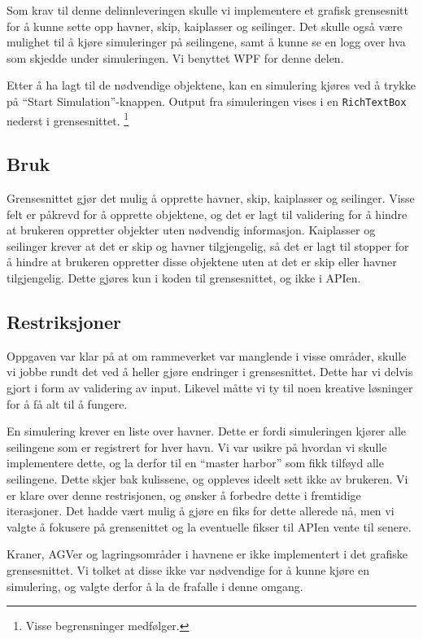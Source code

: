 \documentclass[12pt]{article}
\begin{document}
Som krav til denne delinnleveringen skulle vi implementere et grafisk grensesnitt for 
å kunne sette opp havner, skip, kaiplasser og seilinger. Det skulle også være mulighet til
å kjøre simuleringer på seilingene, samt å kunne se en logg over hva som skjedde under simuleringen.
Vi benyttet WPF for denne delen.

Etter å ha lagt til de nødvendige objektene, kan en simulering kjøres ved å trykke på ``Start Simulation''-knappen.
Output fra simuleringen vises i en \texttt{RichTextBox} nederst i grensesnittet. \footnote{Visse begrensninger medfølger.}

\subsection{Bruk}
Grensesnittet gjør det mulig å opprette havner, skip, kaiplasser og seilinger. Visse felt er påkrevd for å opprette objektene, 
og det er lagt til validering for å hindre at brukeren oppretter objekter uten nødvendig informasjon. 
Kaiplasser og seilinger krever at det er skip og havner tilgjengelig, så det er lagt til stopper for å hindre at brukeren oppretter
disse objektene uten at det er skip eller havner tilgjengelig. Dette gjøres kun i koden til grensesnittet, og ikke i APIen.

\subsection{Restriksjoner}
Oppgaven var klar på at om rammeverket var manglende i visse områder, skulle vi jobbe rundt det ved å 
heller gjøre endringer i grensesnittet. Dette har vi delvis gjort i form av validering av input. Likevel måtte 
vi ty til noen kreative løsninger for å få alt til å fungere.

En simulering krever en liste over havner. Dette er fordi simuleringen kjører alle seilingene som er 
registrert for hver havn. Vi var usikre på hvordan vi skulle implementere dette, og la derfor til
en ``master harbor'' som fikk tilføyd alle seilingene. Dette skjer bak kulissene, og oppleves ideelt sett
ikke av brukeren. Vi er klare over denne restrisjonen, og ønsker å forbedre dette i fremtidige iterasjoner.
Det hadde vært mulig å gjøre en fiks for dette allerede nå, men vi valgte å fokusere på grensenittet og la
eventuelle fikser til APIen vente til senere.

Kraner, AGVer og lagringsområder i havnene er ikke implementert i det grafiske grensesnittet. Vi tolket at disse
ikke var nødvendige for å kunne kjøre en simulering, og valgte derfor å la de frafalle i denne omgang.
\end{document}
